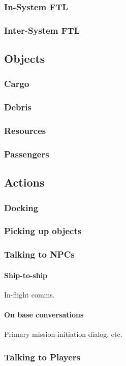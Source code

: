 \subsubsection{In-System FTL}
\subsubsection{Inter-System FTL}
\subsection{Objects}
\subsubsection{Cargo}
\subsubsection{Debris}
\subsubsection{Resources}
\subsubsection{Passengers}
\subsection{Actions}
\subsubsection{Docking}
\subsubsection{Picking up objects}
\subsubsection{Talking to NPCs}
\paragraph{Ship-to-ship}
In-flight comms.
\paragraph{On base conversations}
Primary mission-initiation dialog, etc.
\subsubsection{Talking to Players}
